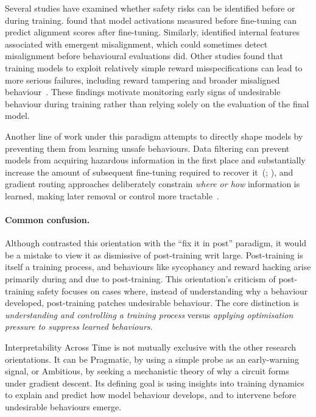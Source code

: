 Several studies have examined whether safety risks can be identified before or during training.  found that model activations measured before fine-tuning can predict alignment scores after fine-tuning. Similarly,  identified internal features associated with emergent misalignment, which could sometimes detect misalignment before behavioural evaluations did. Other studies found that training models to exploit relatively simple reward misspecifications can lead to more serious failures, including reward tampering and broader misaligned behaviour~. These findings motivate monitoring early signs of undesirable behaviour during training rather than relying solely on the evaluation of the final model.

Another line of work under this paradigm attempts to directly shape models by preventing them from learning unsafe behaviours. Data filtering can prevent models from acquiring hazardous information in the first place and substantially increase the amount of subsequent fine-tuning required to recover it~(; ), and gradient routing approaches deliberately constrain \textit{where or how} information is learned, making later removal or control more tractable~.

\paragraph{Common confusion.} Although  contrasted this orientation with the ``fix it in post'' paradigm, it would be a mistake to view it as dismissive of post-training writ large. Post-training is itself a training process, and behaviours like sycophancy and reward hacking arise primarily during and due to post-training. This orientation's criticism of post-training safety focuses on cases where, instead of understanding why a behaviour developed, post-training patches undesirable behaviour. The core distinction is \emph{understanding and controlling a training process} versus \emph{applying optimisation pressure to suppress learned behaviours}.

Interpretability Across Time is not mutually exclusive with the other research orientations. It can be Pragmatic, by using a simple probe as an early-warning signal, or Ambitious, by seeking a mechanistic theory of why a circuit forms under gradient descent. Its defining goal is using insights into training dynamics to explain and predict how model behaviour develops, and to intervene before undesirable behaviours emerge.

